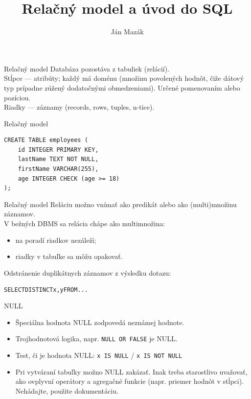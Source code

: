\documentclass[12pt]{beamer}
\title{Relačný model a úvod do SQL}
\author{Ján Mazák}
\institute{FMFI UK Bratislava}
\date{}
\begin{document}
\frame{\titlepage}

\begin{frame}{Relačný model}
Databáza pozostáva z tabuliek (\alert{relácií}).\\[3mm]

Stĺpce --- \alert{atribúty}; každý má doménu (množinu povolených hodnôt, čiže dátový typ prípadne zúžený dodatočnými obmedzeniami). Určené pomenovaním alebo pozíciou.\\[3mm]

Riadky --- \alert{záznamy} (records, rows, tuples, n-tice).
\end{frame}

\begin{frame}[fragile]{Relačný model}
\begin{verbatim}
CREATE TABLE employees (
    id INTEGER PRIMARY KEY,
    lastName TEXT NOT NULL,
    firstName VARCHAR(255),
    age INTEGER CHECK (age >= 18)
);
\end{verbatim}
\end{frame}

\begin{frame}{Relačný model}
Reláciu možno vnímať ako predikát alebo ako (multi)množinu záznamov.\\[3mm]

V bežných DBMS sa relácia chápe ako multimnožina:
\begin{itemize}
\item na poradí riadkov nezáleží;
\item riadky v tabuľke sa môžu opakovať.
\end{itemize}

Odstránenie duplikátnych záznamov z výsledku dotazu:
\begin{alltt}
    SELECT \alert{DISTINCT} x, y FROM ...
\end{alltt}
\end{frame}

\begin{frame}[fragile]{NULL}
\begin{itemize}
\item Špeciálna hodnota \alert{NULL} zodpovedá neznámej hodnote.
\item Trojhodnotová logika, napr. \verb|NULL OR FALSE| je NULL.
\item Test, či je hodnota NULL: \verb|x IS NULL| / \verb|x IS NOT NULL|
\item Pri vytváraní tabuľky možno NULL zakázať.
Inak treba starostlivo uvažovať, ako ovplyvní operátory a agregačné funkcie (napr. priemer hodnôt v stĺpci).
Nehádajte, použite dokumentáciu.
\end{itemize}
\end{frame}
\end{document}
